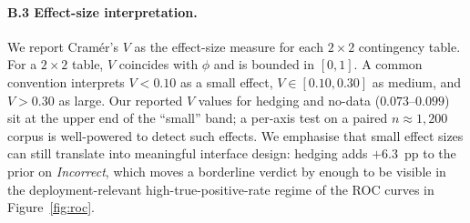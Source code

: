 \documentclass[11pt,a4paper]{article}
\begin{document}
\paragraph{B.3 Effect-size interpretation.}
\label{app:effects}
We report Cram\'{e}r's $V$ as the effect-size measure for each
$2{\times}2$ contingency table. For a $2{\times}2$ table, $V$
coincides with $\phi$ and is bounded in $[0,1]$. A common convention
\citep{cohen1960coefficient} interprets $V<0.10$ as a small effect,
$V\in[0.10,0.30]$ as medium, and $V>0.30$ as large. Our reported
$V$ values for hedging and no-data ($0.073$--$0.099$) sit at the
upper end of the ``small'' band; a per-axis test on a paired
$n\approx1{,}200$ corpus is well-powered to detect such effects.
We emphasise that small effect sizes can still translate into
meaningful interface design: hedging adds $+6.3$~pp to the prior on
\emph{Incorrect}, which moves a borderline verdict by enough to be
visible in the deployment-relevant high-true-positive-rate regime
of the ROC curves in Figure~\ref{fig:roc}.
\end{document}
